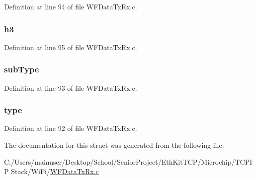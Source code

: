 Definition at line 94 of file W\+F\+Data\+Tx\+Rx.\+c.

\hypertarget{structtx_data_preamble_struct_acaf992828672dce787d7d349490b9688}{}
\subsubsection[{h3}]{ h3}\label{structtx_data_preamble_struct_acaf992828672dce787d7d349490b9688}


Definition at line 95 of file W\+F\+Data\+Tx\+Rx.\+c.

\hypertarget{structtx_data_preamble_struct_a6b8a16b4fff234af40d01cd46be5be45}{}
\subsubsection[{sub\+Type}]{ sub\+Type}\label{structtx_data_preamble_struct_a6b8a16b4fff234af40d01cd46be5be45}


Definition at line 93 of file W\+F\+Data\+Tx\+Rx.\+c.

\hypertarget{structtx_data_preamble_struct_a631bceb766461ab7475c7ed56717aac8}{}
\subsubsection[{type}]{ type}\label{structtx_data_preamble_struct_a631bceb766461ab7475c7ed56717aac8}


Definition at line 92 of file W\+F\+Data\+Tx\+Rx.\+c.



The documentation for this struct was generated from the following file\+:\begin{DoxyCompactItemize}
\item 
C\+:/\+Users/mainuser/\+Desktop/\+School/\+Senior\+Project/\+Eth\+Kit\+T\+C\+P/\+Microchip/\+T\+C\+P\+I\+P Stack/\+Wi\+Fi/\hyperlink{_w_f_data_tx_rx_8c}{W\+F\+Data\+Tx\+Rx.\+c}\end{DoxyCompactItemize}
